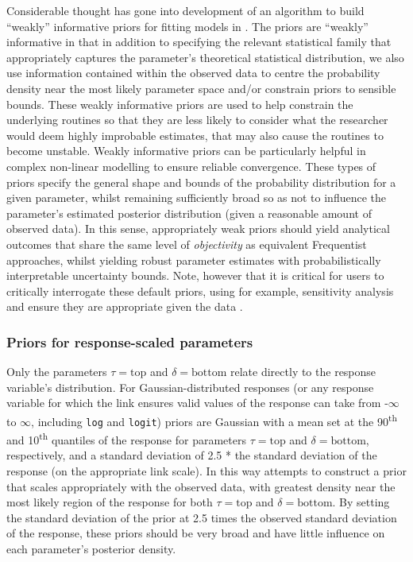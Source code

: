 \documentclass[
  shortnames]{jss}
\begin{document}
Considerable thought has gone into development of an algorithm to build ``weakly'' informative priors for fitting models in . The priors are ``weakly'' informative in that in addition to specifying the relevant statistical family that appropriately captures the parameter's theoretical statistical distribution, we also use information contained within the observed data to centre the probability density near the most likely parameter space and/or constrain priors to sensible bounds. These weakly informative priors are used to help constrain the underlying routines so that they are less likely to consider what the researcher would deem highly improbable estimates, that may also cause the routines to become unstable. Weakly informative priors can be particularly helpful in complex non-linear modelling to ensure reliable convergence. These types of priors specify the general shape and bounds of the probability distribution for a given parameter, whilst remaining sufficiently broad so as not to influence the parameter's estimated posterior distribution (given a reasonable amount of observed data). In this sense, appropriately weak priors should yield analytical outcomes that share the same level of \emph{objectivity} as equivalent Frequentist approaches, whilst yielding robust parameter estimates with probabilistically interpretable uncertainty bounds. Note, however that it is critical for users to critically interrogate these default priors, using for example, sensitivity analysis \citep{depaoli2020importance} and ensure they are appropriate given the data \citep{gelman2017entropy}.

\hypertarget{priors-for-response-scaled-parameters}{%
\subsubsection{Priors for response-scaled parameters}\label{priors-for-response-scaled-parameters}}

Only the parameters \(\tau = \text{top}\) and \(\delta = \text{bottom}\) relate directly to the response variable's distribution. For Gaussian-distributed responses (or any response variable for which the link ensures valid values of the response can take from -\(\infty\) to \(\infty\), including \texttt{log} and \texttt{logit}) priors are Gaussian with a mean set at the 90\textsuperscript{th} and 10\textsuperscript{th} quantiles of the response for parameters \(\tau = \text{top}\) and \(\delta = \text{bottom}\), respectively, and a standard deviation of 2.5 * the standard deviation of the response (on the appropriate link scale). In this way  attempts to construct a prior that scales appropriately with the observed data, with greatest density near the most likely region of the response for both \(\tau = \text{top}\) and \(\delta = \text{bottom}\). By setting the standard deviation of the prior at 2.5 times the observed standard deviation of the response, these priors should be very broad and have little influence on each parameter's posterior density.
\end{document}
